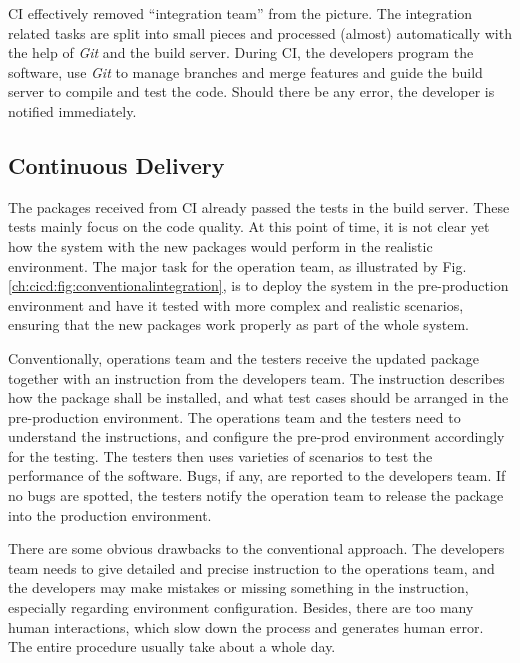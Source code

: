 CI effectively removed ``integration team'' from the picture. The integration related tasks are split into small pieces and processed (almost) automatically with the help of \textit{Git} and the build server. During CI, the developers program the software, use \textit{Git} to manage branches and merge features and guide the build server to compile and test the code. Should there be any error, the developer is notified immediately.

\subsection{Continuous Delivery}

The packages received from CI already passed the tests in the build server. These tests mainly focus on the code quality. At this point of time, it is not clear yet how the system with the new packages would perform in the realistic environment. The major task for the operation team, as illustrated by Fig. \ref{ch:cicd:fig:conventionalintegration}, is to deploy the system in the pre-production environment and have it tested with more complex and realistic scenarios, ensuring that the new packages work properly as part of the whole system.

Conventionally, operations team and the testers receive the updated package together with an instruction from the developers team. The instruction describes how the package shall be installed, and what test cases should be arranged in the pre-production environment. The operations team and the testers need to understand the instructions, and configure the pre-prod environment accordingly for the testing. The testers then uses varieties of scenarios to test the performance of the software. Bugs, if any, are reported to the developers team. If no bugs are spotted, the testers notify the operation team to release the package into the production environment.

There are some obvious drawbacks to the conventional approach. The developers team needs to give detailed and precise instruction to the operations team, and the developers may make mistakes or missing something in the instruction, especially regarding environment configuration. Besides, there are too many human interactions, which slow down the process and generates human error. The entire procedure usually take about a whole day.


